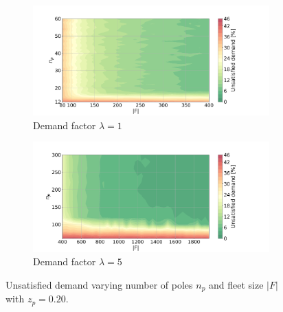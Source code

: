 \begin{figure}[ht]
	\begin{subfigure}{0.5\textwidth}
		\centering
		\includegraphics[width=1\linewidth]{fig/final/contour_unsatisfied_rate-1.pdf}  
		\caption{Demand factor $\lambda=1$}
		\label{fig:10_5_contour_unsatisfied_rate-1}
	\end{subfigure}
	\begin{subfigure}{0.5\textwidth}
		\centering
		\includegraphics[width=1\linewidth]{fig/final/contour_unsatisfied_rate-5.pdf}  
		\caption{Demand factor $\lambda=5$}
		\label{fig:10_5_contour_unsatisfied_rate-5}
	\end{subfigure}
	\caption{Unsatisfied demand varying number of poles $n_p$ and fleet size $|F|$ with $z_p=0.20$.}
	\label{fig:10_5_contour_unsatisfied_rate}
\end{figure}

